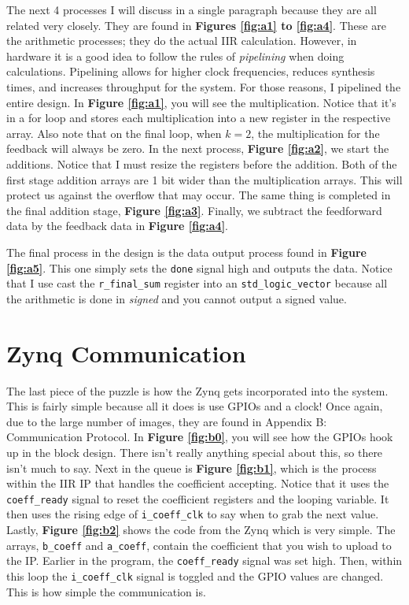 \documentclass[12pt,a4paper,titlepage]{article}
\begin{document}
The next 4 processes I will discuss in a single paragraph because they are all
related very closely. They are found in \textbf{Figures \ref{fig:a1} to
  \ref{fig:a4}}. These are the arithmetic processes; they do the actual IIR
calculation. However, in hardware it is a good idea to follow the rules of
\emph{pipelining} when doing calculations. Pipelining allows for higher clock
frequencies, reduces synthesis times, and increases throughput for the
system. For those reasons, I pipelined the entire design. In \textbf{Figure
  \ref{fig:a1}}, you will see the multiplication. Notice that it's in a for loop
and stores each multiplication into a new register in the respective array. Also
note that on the final loop, when $k = 2$, the multiplication for the feedback
will always be zero. In the next process, \textbf{Figure \ref{fig:a2}}, we start
the additions. Notice that I must resize the registers before the addition. Both
of the first stage addition arrays are 1 bit wider than the multiplication
arrays. This will protect us against the overflow that may occur. The same thing
is completed in the final addition stage, \textbf{Figure \ref{fig:a3}}. Finally,
we subtract the feedforward data by the feedback data in \textbf{Figure
  \ref{fig:a4}}.

The final process in the design is the data output process found in
\textbf{Figure \ref{fig:a5}}. This one simply sets the \texttt{done} signal high
and outputs the data. Notice that I use cast the \texttt{r\_final\_sum} register
into an \texttt{std\_logic\_vector} because all the arithmetic is done in
\emph{signed} and you cannot output a signed value.

\section{Zynq Communication}
\label{sec:zynq}
The last piece of the puzzle is how the Zynq gets incorporated into the
system. This is fairly simple because all it does is use GPIOs and a clock! Once
again, due to the large number of images, they are found in Appendix B:
Communication Protocol. In \textbf{Figure \ref{fig:b0}}, you will see how the
GPIOs hook up in the block design. There isn't really anything special about
this, so there isn't much to say. Next in the queue is \textbf{Figure
  \ref{fig:b1}}, which is the process within the IIR IP that handles the
coefficient accepting. Notice that it uses the \texttt{coeff\_ready} signal to
reset the coefficient registers and the looping variable. It then uses the
rising edge of \texttt{i\_coeff\_clk} to say when to grab the next
value. Lastly, \textbf{Figure \ref{fig:b2}} shows the code from the Zynq which
is very simple. The arrays, \texttt{b\_coeff} and \texttt{a\_coeff}, contain the
coefficient that you wish to upload to the IP. Earlier in the program, the
\texttt{coeff\_ready} signal was set high. Then, within this loop the
\texttt{i\_coeff\_clk} signal is toggled and the GPIO values are changed. This
is how simple the communication is.
\end{document}
